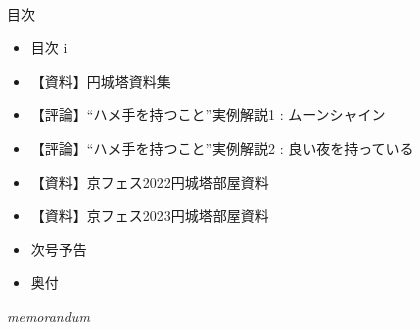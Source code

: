 \documentclass[10pt, a5paper, twoside]{jsarticle}
\theoremstyle{definition}
\begin{document}
	\begin{center}

	~

		\Large{目次}

	\end{center}

	\begin{itemize}

		\item 目次 \dotfill i

			\vspace{3mm}

		\item 【資料】円城塔資料集 

			\vspace{3mm}

		\item 【評論】“ハメ手を持つこと”実例解説1 : ムーンシャイン 

			\vspace{3mm}

		\item 【評論】“ハメ手を持つこと”実例解説2 : 良い夜を持っている 

			\vspace{3mm}

		\item 【資料】京フェス2022円城塔部屋資料 

			\vspace{3mm}

		\item 【資料】京フェス2023円城塔部屋資料 

			\vspace{3mm}

		\item 次号予告 

			\vspace{3mm}

		\item 奥付 

	\end{itemize}

	\vfill


	\newpage

	\begin{center}

		\Large{\textit{memorandum}}

	\end{center}
\end{document}
